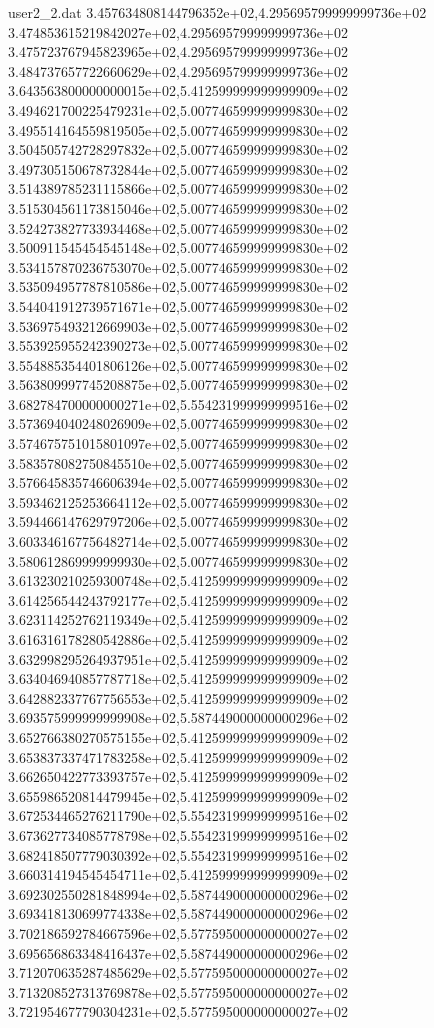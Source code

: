 \begin{filecontents}{user2_2.dat}
3.457634808144796352e+02,4.295695799999999736e+02
3.474853615219842027e+02,4.295695799999999736e+02
3.475723767945823965e+02,4.295695799999999736e+02
3.484737657722660629e+02,4.295695799999999736e+02
3.643563800000000015e+02,5.412599999999999909e+02
3.494621700225479231e+02,5.007746599999999830e+02
3.495514164559819505e+02,5.007746599999999830e+02
3.504505742728297832e+02,5.007746599999999830e+02
3.497305150678732844e+02,5.007746599999999830e+02
3.514389785231115866e+02,5.007746599999999830e+02
3.515304561173815046e+02,5.007746599999999830e+02
3.524273827733934468e+02,5.007746599999999830e+02
3.500911545454545148e+02,5.007746599999999830e+02
3.534157870236753070e+02,5.007746599999999830e+02
3.535094957787810586e+02,5.007746599999999830e+02
3.544041912739571671e+02,5.007746599999999830e+02
3.536975493212669903e+02,5.007746599999999830e+02
3.553925955242390273e+02,5.007746599999999830e+02
3.554885354401806126e+02,5.007746599999999830e+02
3.563809997745208875e+02,5.007746599999999830e+02
3.682784700000000271e+02,5.554231999999999516e+02
3.573694040248026909e+02,5.007746599999999830e+02
3.574675751015801097e+02,5.007746599999999830e+02
3.583578082750845510e+02,5.007746599999999830e+02
3.576645835746606394e+02,5.007746599999999830e+02
3.593462125253664112e+02,5.007746599999999830e+02
3.594466147629797206e+02,5.007746599999999830e+02
3.603346167756482714e+02,5.007746599999999830e+02
3.580612869999999930e+02,5.007746599999999830e+02
3.613230210259300748e+02,5.412599999999999909e+02
3.614256544243792177e+02,5.412599999999999909e+02
3.623114252762119349e+02,5.412599999999999909e+02
3.616316178280542886e+02,5.412599999999999909e+02
3.632998295264937951e+02,5.412599999999999909e+02
3.634046940857787718e+02,5.412599999999999909e+02
3.642882337767756553e+02,5.412599999999999909e+02
3.693575999999999908e+02,5.587449000000000296e+02
3.652766380270575155e+02,5.412599999999999909e+02
3.653837337471783258e+02,5.412599999999999909e+02
3.662650422773393757e+02,5.412599999999999909e+02
3.655986520814479945e+02,5.412599999999999909e+02
3.672534465276211790e+02,5.554231999999999516e+02
3.673627734085778798e+02,5.554231999999999516e+02
3.682418507779030392e+02,5.554231999999999516e+02
3.660314194545454711e+02,5.412599999999999909e+02
3.692302550281848994e+02,5.587449000000000296e+02
3.693418130699774338e+02,5.587449000000000296e+02
3.702186592784667596e+02,5.577595000000000027e+02
3.695656863348416437e+02,5.587449000000000296e+02
3.712070635287485629e+02,5.577595000000000027e+02
3.713208527313769878e+02,5.577595000000000027e+02
3.721954677790304231e+02,5.577595000000000027e+02

\end{filecontents}
